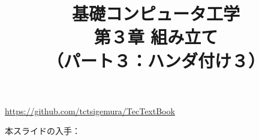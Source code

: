 \documentclass[handout]{beamer}        %
\begin{document}
\title{基礎コンピュータ工学\\第３章 組み立て\\
       （パート３：ハンダ付け３）}
\date{}

\begin{frame}
  \titlepage
  \centerline{\url{https://github.com/tctsigemura/TecTextBook}}
  \vfill
  \centerline{本スライドの入手：
    }
\end{frame}

\end{document}
